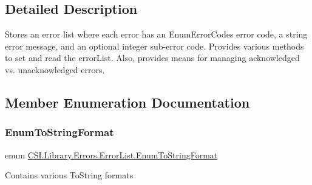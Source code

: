 \subsection{Detailed Description}
Stores an error list where each error has an Enum\+Error\+Codes error code, a string error message, and an optional integer sub-\/error code. Provides various methods to set and read the error\+List. Also, provides means for managing acknowledged vs. unacknowledged errors. 



\subsection{Member Enumeration Documentation}
\mbox{\label{class_c_s_i_1_1_library_1_1_errors_1_1_error_list_aa208d07fb97d8c5eaa0910fde0c7921e}} 
\subsubsection{\texorpdfstring{EnumToStringFormat}{EnumToStringFormat}}
{\footnotesize\ttfamily enum \mbox{\hyperlink{class_c_s_i_1_1_library_1_1_errors_1_1_error_list_aa208d07fb97d8c5eaa0910fde0c7921e}{C\+S\+I.\+Library.\+Errors.\+Error\+List.\+Enum\+To\+String\+Format}}\hspace{0.3cm}{\ttfamily [strong]}}



Contains various To\+String formats 

